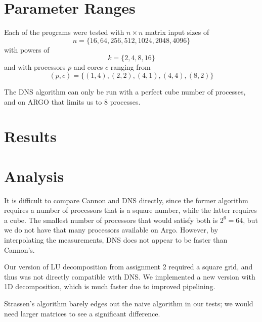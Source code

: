 \documentclass{article}
\begin{document}
\section{Parameter Ranges}

Each of the programs were tested with $n \times n$ matrix input sizes of $$n =
\{ 16, 64, 256, 512, 1024, 2048, 4096 \}$$ with powers of $$k=\{ 2, 4, 8,
16 \}$$ and with processors $p$ and cores $c$ ranging from $$(p,c) = \{ (1,4),
(2,2), (4,1), (4,4), (8,2) \}$$

The DNS algorithm can only be run with a perfect cube number of processes, and
on ARGO that limits us to 8 processes.

\section{Results}



\section{Analysis}

It is difficult to compare Cannon and DNS directly, since the former algorithm requires a number of processors
 that is a square number, while the latter requires a cube. The smallest number of processors that would satisfy both is $2^6 = 64$, but we do not have
 that many processors available on Argo. However, by interpolating the measurements, DNS does not appear to be faster than Cannon's.

Our version of LU decomposition from assignment 2 required a square grid, and thus was not directly compatible with DNS. We implemented a new version with
1D decomposition, which is much faster due to improved pipelining.

Strassen's algorithm barely edges out the naive algorithm in our tests; we would need larger matrices to see a significant difference.


% 
% 
% 
\end{document}
